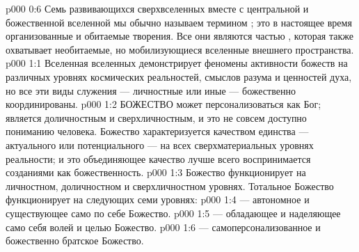 \vs p000 0:6 Семь развивающихся сверхвселенных вместе с центральной и божественной вселенной мы обычно называем термином ; это в настоящее время организованные и обитаемые творения. Все они являются частью , которая также охватывает необитаемые, но мобилизующиеся вселенные внешнего пространства.
\vs p000 1:1 Вселенная вселенных демонстрирует феномены активности божеств на различных уровнях космических реальностей, смыслов разума и ценностей духа, но все эти виды служения --- личностные или иные --- божественно координированы.
\vs p000 1:2 \pc БОЖЕСТВО может персонализоваться как Бог; является доличностным и сверхличностным, и это не совсем доступно пониманию человека. Божество характеризуется качеством единства --- актуального или потенциального --- на всех сверхматериальных уровнях реальности; и это объединяющее качество лучше всего воспринимается созданиями как божественность.
\vs p000 1:3 \pc Божество функционирует на личностном, доличностном и сверхличностном уровнях. Тотальное Божество функционирует на следующих семи уровнях:
\vs p000 1:4  --- автономное и существующее само по себе Божество.
\vs p000 1:5  --- обладающее и наделяющее само себя волей и целью Божество.
\vs p000 1:6  --- самоперсонализованное и божественно братское Божество.
